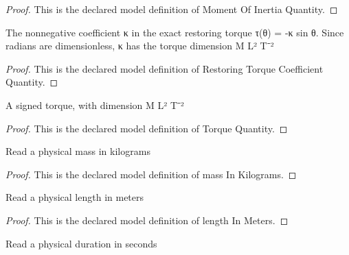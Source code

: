 \begin{proof}
  This is the declared model definition of Moment Of Inertia Quantity.
\end{proof}
\begin{definition}
  \label{def:physics:phyx-mini-0229:phyxminiproblems-problemphyxmini0229-restoringtorquecoefficientquantity}
  The nonnegative coefficient κ in the exact restoring torque τ(θ) = -κ sin θ. Since radians are dimensionless, κ has the torque dimension M L² T⁻²
\end{definition}
\begin{proof}
  This is the declared model definition of Restoring Torque Coefficient Quantity.
\end{proof}
\begin{definition}
  \label{def:physics:phyx-mini-0229:phyxminiproblems-problemphyxmini0229-torquequantity}
  A signed torque, with dimension M L² T⁻²
\end{definition}
\begin{proof}
  This is the declared model definition of Torque Quantity.
\end{proof}
\begin{definition}
  \label{def:physics:phyx-mini-0229:phyxminiproblems-problemphyxmini0229-massinkilograms}
  Read a physical mass in kilograms
\end{definition}
\begin{proof}
  This is the declared model definition of mass In Kilograms.
\end{proof}
\begin{definition}
  \label{def:physics:phyx-mini-0229:phyxminiproblems-problemphyxmini0229-lengthinmeters}
  Read a physical length in meters
\end{definition}
\begin{proof}
  This is the declared model definition of length In Meters.
\end{proof}
\begin{definition}
  \label{def:physics:phyx-mini-0229:phyxminiproblems-problemphyxmini0229-timeinseconds}
  Read a physical duration in seconds
\end{definition}
